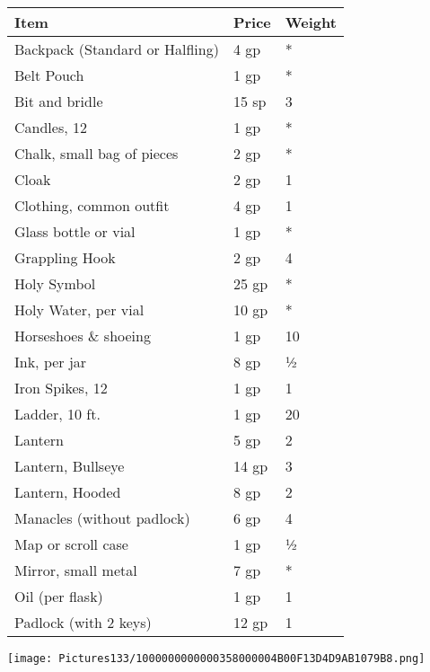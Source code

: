 \documentclass[a4paper,twoside,openany,10pt]{book}
\begin{document}
\begin{multicols}{2}
\begin{tabular*}{0.93\linewidth}{@{\extracolsep{\fill}}lll}
\textbf{Item} & \textbf{Price} & \textbf{Weight} \\\toprule
Backpack (Standard or Halfling) & 4 gp & * \\\hline
Belt Pouch & 1 gp & * \\\hline
Bit and bridle & 15 sp & 3 \\\hline
Candles, 12 & 1 gp & * \\\hline
Chalk, small bag of pieces & 2 gp & * \\\hline
Cloak & 2 gp & 1 \\\hline
Clothing, common outfit & 4 gp & 1 \\\hline
Glass bottle or vial & 1 gp & * \\\hline
Grappling Hook & 2 gp & 4 \\\hline
Holy Symbol & 25 gp & * \\\hline
Holy Water, per vial & 10 gp & * \\\hline
Horseshoes \& shoeing & 1 gp & 10 \\\hline
Ink, per jar & 8 gp & ½ \\\hline
Iron Spikes, 12 & 1 gp & 1 \\\hline
Ladder, 10 ft. & 1 gp & 20 \\\hline
Lantern & 5 gp & 2 \\\hline
Lantern, Bullseye & 14 gp & 3 \\\hline
Lantern, Hooded & 8 gp & 2 \\\hline
Manacles (without padlock) & 6 gp & 4 \\\hline
Map or scroll case & 1 gp & ½ \\\hline
Mirror, small metal & 7 gp & * \\\hline
Oil (per flask) & 1 gp & 1 \\\hline
Padlock (with 2 keys) & 12 gp & 1 \\\bottomrule
\end{tabular*}

\texttt{[image: Pictures133/1000000000000358000004B00F13D4D9AB1079B8.png]}
\vfill


\end{multicols}
\end{document}
